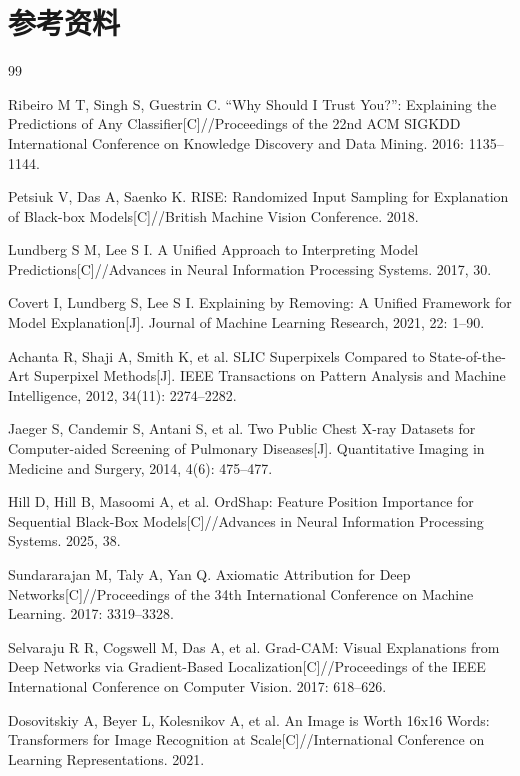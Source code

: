 
\clearpage
{}
\chapter*{参考资料}

\begin{thebibliography}{99}

Ribeiro M T, Singh S, Guestrin C. ``Why Should I Trust You?'': Explaining the Predictions of Any Classifier[C]//Proceedings of the 22nd ACM SIGKDD International Conference on Knowledge Discovery and Data Mining. 2016: 1135--1144.

Petsiuk V, Das A, Saenko K. RISE: Randomized Input Sampling for Explanation of Black-box Models[C]//British Machine Vision Conference. 2018.

Lundberg S M, Lee S I. A Unified Approach to Interpreting Model Predictions[C]//Advances in Neural Information Processing Systems. 2017, 30.

Covert I, Lundberg S, Lee S I. Explaining by Removing: A Unified Framework for Model Explanation[J]. Journal of Machine Learning Research, 2021, 22: 1--90.

Achanta R, Shaji A, Smith K, et al. SLIC Superpixels Compared to State-of-the-Art Superpixel Methods[J]. IEEE Transactions on Pattern Analysis and Machine Intelligence, 2012, 34(11): 2274--2282.

Jaeger S, Candemir S, Antani S, et al. Two Public Chest X-ray Datasets for Computer-aided Screening of Pulmonary Diseases[J]. Quantitative Imaging in Medicine and Surgery, 2014, 4(6): 475--477.

Hill D, Hill B, Masoomi A, et al. OrdShap: Feature Position Importance for Sequential Black-Box Models[C]//Advances in Neural Information Processing Systems. 2025, 38.

Sundararajan M, Taly A, Yan Q. Axiomatic Attribution for Deep Networks[C]//Proceedings of the 34th International Conference on Machine Learning. 2017: 3319--3328.

Selvaraju R R, Cogswell M, Das A, et al. Grad-CAM: Visual Explanations from Deep Networks via Gradient-Based Localization[C]//Proceedings of the IEEE International Conference on Computer Vision. 2017: 618--626.

Dosovitskiy A, Beyer L, Kolesnikov A, et al. An Image is Worth 16x16 Words: Transformers for Image Recognition at Scale[C]//International Conference on Learning Representations. 2021.

\end{thebibliography}
